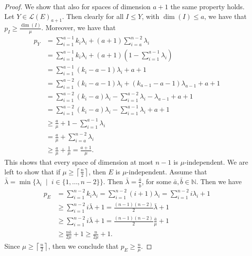 \documentclass[10pt,a4paper]{amsart}
\newcommand{\mL}{\mathcal{L}}
\begin{document}
\begin{proof}
We show that also for spaces of dimension $a+1$ the same property holds. Let $Y\in\mL(E)_{a+1}$. Then clearly for all $I\leq Y$, with $\dim(I)\leq a$, we have that $p_I\geq \frac{\dim(I)}{\mu}$. Moreover, we have that
\begin{align*}
    p_Y &= \sum\limits_{i=1}^{a-1}k_i\lambda_i + (a+1)\sum\limits_{i=a}^{n-2}\lambda_i \\
    &= \sum\limits_{i=1}^{a-1}k_i\lambda_i + (a+1)\left(1-\sum\limits_{i=1}^{a-1}\lambda_i \right) \\
    &=\sum\limits_{i=1}^{a-1}(k_i-a-1)\lambda_i + a+1\\
     &=\sum\limits_{i=1}^{a-2}(k_i-a-1)\lambda_i + (k_{a-1}-a-1)\lambda_{a-1}+ a+1\\
     &=\sum\limits_{i=1}^{a-2}(k_i-a)\lambda_i -\sum\limits_{i=1}^{a-2}\lambda_i -\lambda_{a-1}+ a+1\\
      &=\sum\limits_{i=1}^{a-2}(k_i-a)\lambda_i -\sum\limits_{i=1}^{a-1}\lambda_i + a+1\\
      &\geq \frac{a}{\mu} +1-\sum\limits_{i=1}^{a-1}\lambda_i\\
      &= \frac{a}{\mu} + \sum\limits_{i=a}^{n-2}\lambda_i\\
      &\geq \frac{a}{\mu} + \frac{1}{\mu} =\frac{a+1}{\mu}.
\end{align*}
This shows that every space of dimension at most $n-1$ is $\mu$-independent. We are left to show that if $\mu\geq \left\lceil \frac{n}{2}\right\rceil$, then $E$ is $\mu$-independent. Assume that $\bar{\lambda}=\min\{\lambda_i \; \mid \; i\in\{1,\dots, n-2\}\}$. Then $\bar{\lambda}=\frac{\bar{a}}{\bar{b}}$, for some $\bar{a},\bar{b}\in\mathbb{N}$. Then we have
\begin{align*}
    p_{E}&= \sum\limits_{i=1}^{n-2}k_i\lambda_i = \sum\limits_{i=1}^{n-2}(i+1)\lambda_i = \sum\limits_{i=1}^{n-2}i\lambda_i +1\\
    &\geq \sum\limits_{i=1}^{n-2}i\bar{\lambda} +1 = \frac{(n-1)(n-2)}{2}\bar{\lambda} +1 \\
     &\geq \sum\limits_{i=1}^{n-2}i\bar{\lambda} +1 = \frac{(n-1)(n-2)}{2}\frac{\bar{a}}{\mu} +1 \\
     &\geq \frac{n\bar{a}}{2\mu}+1 \geq \frac{n}{2\mu}+1.
\end{align*}
Since $\mu\geq\left\lceil\frac{n}{2}\right\rceil$, then we conclude that $p_{E}\geq \frac{n}{\mu}$.

\end{proof}
\end{document}
